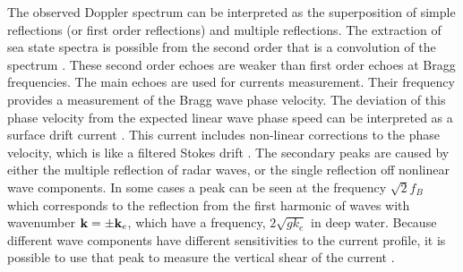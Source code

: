 The observed Doppler spectrum can be
interpreted as the superposition of simple reflections (or first order reflections) and multiple reflections. 
The extraction of sea state spectra is possible from the second order that is a convolution of the spectrum 
\citep[see for instance][]{Wyatt2000}. These second order echoes are weaker than first order echoes at Bragg frequencies. The main echoes are used for currents measurement. Their frequency provides a measurement of the Bragg wave phase velocity. The deviation 
of this phase velocity from the expected linear wave phase speed can be interpreted as a surface drift current \citep{Ardhuin&al.2009b}. 
This current includes non-linear corrections to the phase velocity, which is like a filtered Stokes drift \citep{Stewart&Joy1974,Broche&al.1983,Ardhuin&al.2009}.
The secondary peaks are caused by either the multiple reflection of radar waves, or the single reflection off nonlinear wave components. 
In some cases a peak can be seen at the frequency $\sqrt{2}f_B$ which corresponds to the reflection from the first harmonic of waves with wavenumber 
$\mathbf{k} = \pm \mathbf{k}_e$, which have a frequency, $2\sqrt{g k_e}$ in deep water. Because different wave components have different sensitivities to the current profile, 
it is possible to use that peak to measure the vertical shear of the current \citep{Ivonin&al.2004}. 



